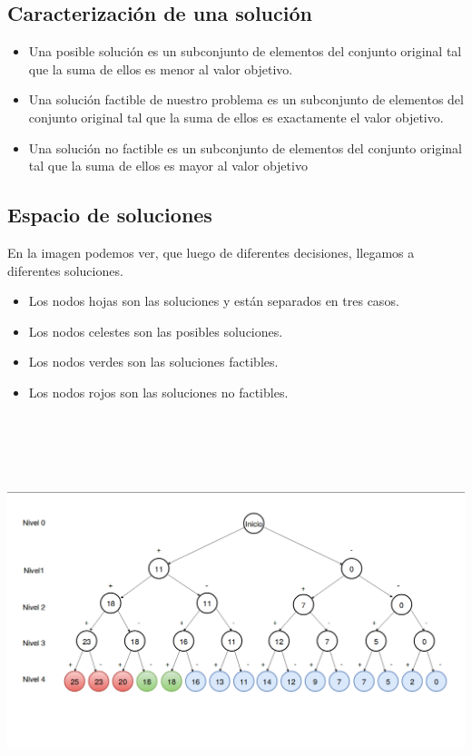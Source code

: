 \subsection{Caracterizaci\'on de una soluci\'on}
\begin{itemize}
	\item Una posible soluci\'on es un subconjunto de elementos del conjunto original tal que la suma de ellos es menor al valor objetivo.
	\item Una soluci\'on factible de nuestro problema es un subconjunto de elementos del conjunto original tal que la suma de ellos es exactamente el valor objetivo.
	\item Una soluci\'on no factible es un subconjunto de elementos del conjunto original tal que la suma de ellos es mayor al valor objetivo
\end{itemize}
\subsection{Espacio de soluciones}
En la imagen podemos ver, que luego de diferentes decisiones, llegamos a diferentes soluciones.
\begin{itemize}
	\item Los nodos hojas son las soluciones y est\'an separados en tres casos.
	\item Los nodos celestes son las posibles soluciones.
	\item Los nodos verdes son las soluciones factibles.
	\item Los nodos rojos son las soluciones no factibles. 
\end{itemize}	
\begin{center}
\includegraphics[width=18cm, height=12cm]{3casos.png}
\end{center}

